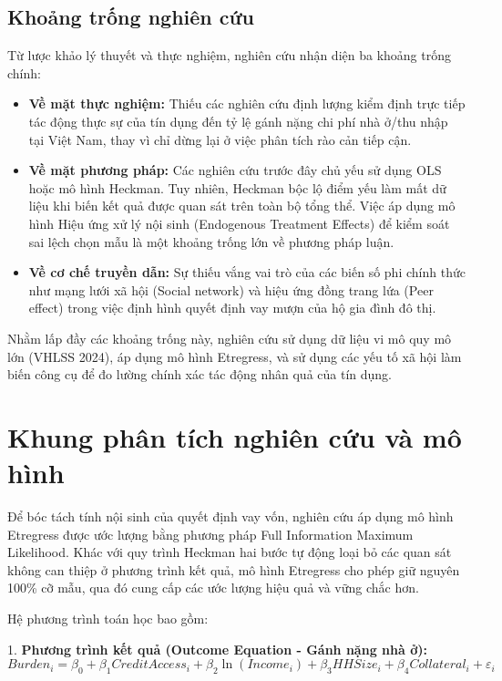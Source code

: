 \documentclass[12pt,a4paper]{report}
\begin{document}
\subsection{Khoảng trống nghiên cứu}
Từ lược khảo lý thuyết và thực nghiệm, nghiên cứu nhận diện ba khoảng trống chính:
\begin{itemize}
	\item \textbf{Về mặt thực nghiệm:} Thiếu các nghiên cứu định lượng kiểm định trực tiếp tác động thực sự của tín dụng đến tỷ lệ gánh nặng chi phí nhà ở/thu nhập tại Việt Nam, thay vì chỉ dừng lại ở việc phân tích rào cản tiếp cận.
	\item \textbf{Về mặt phương pháp:} Các nghiên cứu trước đây chủ yếu sử dụng OLS hoặc mô hình Heckman. Tuy nhiên, Heckman bộc lộ điểm yếu làm mất dữ liệu khi biến kết quả được quan sát trên toàn bộ tổng thể. Việc áp dụng mô hình Hiệu ứng xử lý nội sinh (Endogenous Treatment Effects) để kiểm soát sai lệch chọn mẫu là một khoảng trống lớn về phương pháp luận.
	\item \textbf{Về cơ chế truyền dẫn:} Sự thiếu vắng vai trò của các biến số phi chính thức như mạng lưới xã hội (Social network) và hiệu ứng đồng trang lứa (Peer effect) trong việc định hình quyết định vay mượn của hộ gia đình đô thị.
\end{itemize}

Nhằm lấp đầy các khoảng trống này, nghiên cứu sử dụng dữ liệu vi mô quy mô lớn (VHLSS 2024), áp dụng mô hình Etregress, và sử dụng các yếu tố xã hội làm biến công cụ để đo lường chính xác tác động nhân quả của tín dụng.


\section{Khung phân tích nghiên cứu và mô hình}

Để bóc tách tính nội sinh của quyết định vay vốn, nghiên cứu áp dụng mô hình Etregress được ước lượng bằng phương pháp Full Information Maximum Likelihood. Khác với quy trình Heckman hai bước tự động loại bỏ các quan sát không can thiệp ở phương trình kết quả, mô hình Etregress cho phép giữ nguyên 100\% cỡ mẫu, qua đó cung cấp các ước lượng hiệu quả và vững chắc hơn.

Hệ phương trình toán học bao gồm:

1. \textbf{Phương trình kết quả (Outcome Equation - Gánh nặng nhà ở):}
\begin{equation}
	Burden_i = \beta_0 + \beta_1 CreditAccess_i + \beta_2 \ln(Income_i) + \beta_3 HHSize_i + \beta_4 Collateral_i + \varepsilon_i 
\end{equation}
\end{document}
